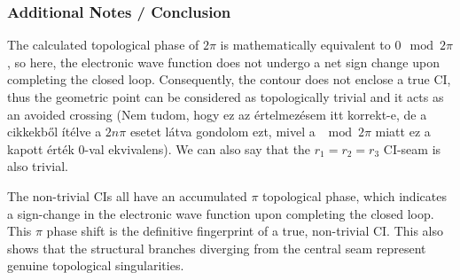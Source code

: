 \documentclass{article}
\begin{document}
\subsubsection{Additional Notes / Conclusion}

The calculated topological phase of $2\pi$ is mathematically equivalent to $0 \mod{2\pi}$, so here, the electronic wave function does not undergo a net sign change upon completing the closed loop. Consequently, the contour does not enclose a true CI, thus the geometric point can be considered as topologically trivial and it acts as an avoided crossing (Nem tudom, hogy ez az értelmezésem itt korrekt-e, de a cikkekből ítélve a $2n\pi$ esetet látva gondolom ezt, mivel a $\mod{2\pi}$ miatt ez a kapott érték $0$-val ekvivalens). We can also say that the $r_1 = r_2 = r_3$ CI-seam is also trivial.

The non-trivial CIs all have an accumulated $\pi$ topological phase, which indicates a sign-change in the electronic wave function upon completing the closed loop.  This $\pi$ phase shift is the definitive fingerprint of a true, non-trivial CI. This also shows that the structural branches diverging from the central seam represent genuine topological singularities.
\end{document}
